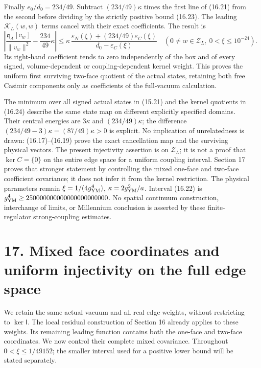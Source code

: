 \documentclass[
]{article}
\begin{document}
Finally \(e_0/d_0=234/49\). Subtract \((234/49)\kappa\) times the first
line of (16.21) from the second before dividing by the strictly positive
bound (16.23). The leading \(\mathcal K_L(w,w)\) terms cancel with their
exact coefficients. The result is \[
\left|
 \frac{\mathfrak q_A[v_w]}{\|v_w\|^2}
          -\frac{234}{49}\kappa
\right|
\le
\kappa\,
\frac{\varepsilon_N(\xi)+(234/49)\varepsilon_C(\xi)}
     {d_0-\varepsilon_C(\xi)}
\quad
\left(0\ne w\in\mathscr Z_L,\ 0<\xi\le10^{-24}\right).
                                                               \tag{16.24}
\] Its right-hand coefficient tends to zero independently of the box and
of every signed, volume-dependent or coupling-dependent kernel weight.
This proves the uniform first surviving two-face quotient of the actual
states, retaining both free Casimir components only as coefficients of
the full-vacuum calculation.

The minimum over all signed actual states in (15.21) and the kernel
quotients in (16.24) describe the same state map on different explicitly
specified domains. Their central energies are \(3\kappa\) and
\((234/49)\kappa\); the difference \((234/49-3)\kappa=(87/49)\kappa>0\)
is explicit. No implication of unrelatedness is drawn: (16.17)--(16.19)
prove the exact cancellation map and the surviving physical vectors. The
present injectivity assertion is on \(\mathscr Z_L\); it is not a proof
that \(\ker C=\{0\}\) on the entire edge space for a uniform coupling
interval. Section 17 proves that stronger statement by controlling the
mixed one-face and two-face coefficient covariance; it does not infer it
from the kernel restriction. The physical parameters remain
\(\xi=1/(4g_{\rm YM}^4)\), \(\kappa=2g_{\rm YM}^2/a\). Interval (16.22)
is \(g_{\rm YM}^4\ge250000000000000000000000\). No spatial continuum
construction, interchange of limits, or Millennium conclusion is
asserted by these finite-regulator strong-coupling estimates.

\section{17. Mixed face coordinates and uniform injectivity on the full
edge
space}\label{mixed-face-coordinates-and-uniform-injectivity-on-the-full-edge-space}

We retain the same actual vacuum and all real edge weights, without
restricting to \(\ker\mathsf I\). The local residual construction of
Section 16 already applies to these weights. Its remaining leading
function contains both the one-face and two-face coordinates. We now
control their complete mixed covariance. Throughout \(0<\xi\le1/49152\);
the smaller interval used for a positive lower bound will be stated
separately.
\end{document}
